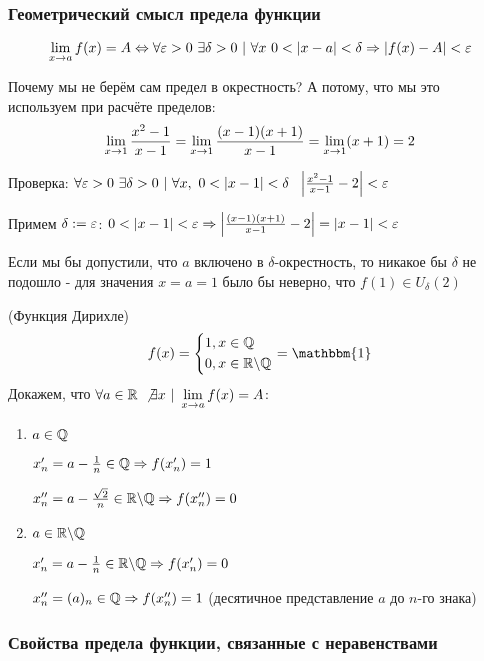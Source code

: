\subsubsection*{Геометрический смысл предела функции}

$$
	\lim\limits_{x \rightarrow a} f(x) = A \Leftrightarrow \forall \varepsilon > 0\ \exists \delta > 0\ |\ \forall x\ 0 < |x - a| < \delta \Rightarrow |f(x) - A| < \varepsilon
$$


\begin{example}
	Почему мы не берём сам предел в окрестность? А потому, что мы это используем при расчёте пределов:
	$$
		\lim\limits_{x \rightarrow 1} \frac{x^2 - 1}{x - 1} = \lim\limits_{x \rightarrow 1} \frac{(x - 1)(x + 1)}{x - 1} = \lim\limits_{x \rightarrow 1} (x + 1) = 2
	$$
	
	Проверка:
	$\forall \eps > 0\ \exists \delta > 0\ |\ \forall x,\ 0 < |x - 1| < \delta\ \ \left|\frac{x^2 - 1}{x - 1} - 2\right| < \eps$
	
	Примем $\delta := \varepsilon$: $0 < |x - 1| < \varepsilon \Rightarrow \left|\frac{(x - 1)(x + 1)}{x - 1} - 2\right| = |x - 1| < \varepsilon$
	
	Если мы бы допустили, что $a$ включено в $\delta$-окрестность, то никакое бы $\delta$ не подошло - для значения $x = a = 1$ было бы неверно, что $f(1) \in U_{\delta}(2)$
\end{example}

\begin{example} (Функция Дирихле)
	\[
		f(x) = \System{&{1, x \in \Q} \\ &{0, x \in \R \bs \Q}} = \mathbbm{1}
	\]
	Докажем, что $\forall a \in \mathbb{R}\ \not\exists x\ |\ \lim\limits_{x \rightarrow a} f(x) = A$:
	
	\begin{enumerate}
		\item $a \in \mathbb{Q}$
		
		$x'_n = a - \frac{1}{n} \in \mathbb{Q} \Rightarrow f(x'_n) = 1$
		
		$x''_n = a - \frac{\sqrt{2}}{n} \in \mathbb{R} \backslash \mathbb{Q} \Rightarrow f(x''_n) = 0$
		
		\item $a \in \mathbb{R} \backslash \mathbb{Q}$
		
		$x'_n = a - \frac{1}{n} \in \mathbb{R} \backslash \mathbb{Q} \Rightarrow f(x'_n) = 0$
		
		$x''_n = (a)_n \in \mathbb{Q} \Rightarrow f(x''_n) = 1$ (десятичное представление $a$ до $n$-го знака)
	\end{enumerate}
\end{example}

\subsubsection*{Свойства предела функции, связанные с неравенствами}

